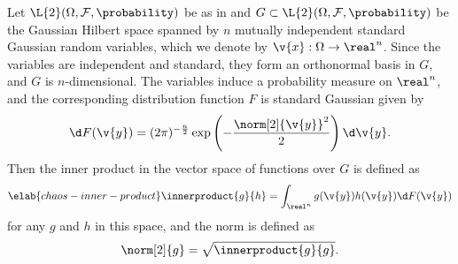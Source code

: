 Let $\L{2}(\Omega, \mathcal{F}, \probability)$ be as in
 and $G \subset \L{2}(\Omega, \mathcal{F},
\probability)$ be the Gaussian Hilbert space \cite{janson1997} spanned by $n$
mutually independent standard Gaussian random variables, which we denote by
$\v{x}: \Omega \to \real^n$. Since the variables are independent and standard,
they form an orthonormal basis in $G$, and $G$ is $n$-dimensional. The variables
induce a probability measure on $\real^n$, and the corresponding distribution
function $F$ is standard Gaussian given by
\[
  \d F(\v{y}) = (2 \pi)^{-\frac{n}{2}} \exp\left(-\frac{\norm[2]{\v{y}}^2}{2}\right) \d \v{y}.
\]
Then the inner product in the vector space of functions over $G$ is defined as
\begin{equation} \elab{chaos-inner-product}
  \innerproduct{g}{h} = \int_{\real^n} g(\v{y}) h(\v{y}) \d F(\v{y})
\end{equation}
for any $g$ and $h$ in this space, and the norm is defined as
\[
  \norm[2]{g} = \sqrt{\innerproduct{g}{g}}.
\]

